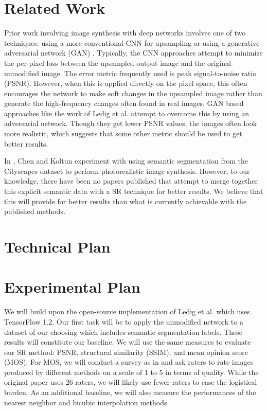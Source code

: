 \documentclass[10pt,twocolumn,letterpaper]{article}
\begin{document}
\section{Related Work}
Prior work involving image synthesis with deep networks involves one of two
techniques: using a more conventional CNN for upsampling
\cite{PerceptualLosses} \cite{RealtimeCNN} \cite{DeeplyRecursive} or using a
generative adversarial network (GAN) \cite{GAN}. Typically, the CNN approaches
attempt to minimize the per-pixel loss between the upsampled output image and
the original unmodified image. The error metric frequently used is peak
signal-to-noise ratio (PSNR). However, when this is applied directly on the
pixel space, this often encourages the network to make soft changes in the
upsampled image rather than generate the high-frequency changes often found in
real images. GAN based approaches like the work of Ledig et al. \cite{SRGAN}
attempt to overcome this by using an adversarial network. Though they get lower
PSNR values, the images often look more realistic, which suggests that some
other metric should be used to get better results.

In \cite{ImageSynthesis}, Chen and Koltun experiment with using semantic
segmentation from the Cityscapes dataset \cite{Cityscapes} to perform
photorealistic image synthesis. However, to our knowledge, there have been no
papers published that attempt to merge together this explicit semantic data
with a SR technique for better results. We believe that this will provide for
better results than what is currently achievable with the published methods.


\section{Technical Plan}


\section{Experimental Plan}
We will build upon the open-source implementation of Ledig et al. \cite{SRGAN}
which uses TensorFlow 1.2. Our first task will be to apply the unmodified
network to a dataset of our choosing which includes semantic segmentation
labels. These results will constitute our baseline. We will use the same
measures to evaluate our SR method: PSNR, structural similarity (SSIM), and
mean opinion score (MOS). For MOS, we will conduct a survey as in \cite{SRGAN}
and ask raters to rate images produced by different methods on a scale of 1 to
5 in terms of quality. While the original paper uses 26 raters, we will likely
use fewer raters to ease the logistical burden. As an additional baseline, we
will also measure the performances of the nearest neighbor and bicubic
interpolation methods.
\end{document}
